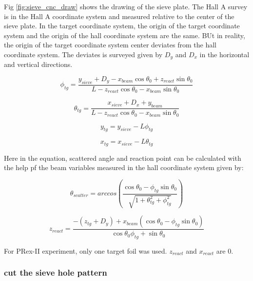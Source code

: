 Fig \ref{fig:sieve_cnc_draw} shows the drawing of the sieve plate. The Hall A survey is in the Hall A coordinate system and measured relative to the center of the sieve plate. In the target coordinate system, the origin of the target coordinate system and the origin of the hall coordinate system are the same. BUt in reality, the origin of the target coordinate system center deviates from the hall coordinate system. The deviates is surveyed given by $D_y$ and $D_x$ in the horizontal and vertical directions.  


\begin{equation}
    \phi_{tg} = \frac{y_{sieve} + D_y - x_{beam}\cos{\theta_0} + z_{react}\sin{\theta_0}}{L - z_{react}\cos{\theta_0 - x_{beam}\sin{\theta_0}}}
\end{equation}

\begin{equation}
    \theta_{tg} = \frac{x_{sieve} + D_x + y_{beam}}{L - z_{react}\cos{\theta_0} - x_{beam}\sin{\theta_0}}
\end{equation}


\begin{equation}
    y_{tg} = y_{sieve}  - L \phi_{tg}
\end{equation}

\begin{equation}
x_{tg} = x_{sieve} - L \theta_{tg}
\end{equation}


Here in the equation, scattered angle and reaction point can be calculated with the help pf the beam variables measured in the hall coordinate system given by:

\begin{equation}
    \theta_{scatter} = arccos(\frac{\cos{\theta_0 - \phi_{tg}\sin{\theta_0}}}{\sqrt{1 + \theta^2_{tg} + \phi^2_{tg}}})
\end{equation}


\begin{equation}
    z_{react} = \frac{-(z_{tg} + D_y) + x_{beam}(\cos{\theta_0} - \phi_{tg}\sin{\theta_0})}{\cos{\theta_0\phi_{tg} +  \sin{\theta_0}}}
\end{equation}


For PRex-II experiment, only one target foil was used. $z_{react}$ and $x_{react}$ are 0.

\subsubsection{cut the sieve hole pattern}



